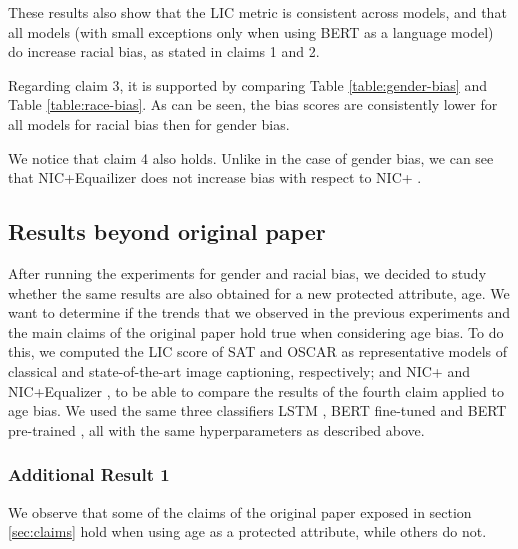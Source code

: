 These results also show that the LIC metric is consistent across models, and that all models (with small exceptions only when using BERT as a language model) do increase racial bias, as stated in claims 1 and 2.

Regarding claim 3, it is supported by comparing Table \ref{table:gender-bias} and Table \ref{table:race-bias}. As can be seen, the bias scores are consistently lower for all models for racial bias then for gender bias.

We notice that claim 4 also holds. Unlike in the case of gender bias, we can see that NIC+Equailizer \cite{Burns2018} does not increase bias with respect to NIC+ \cite{Burns2018}.


\subsection{Results beyond original paper}
\label{sec:results-beyond}

After running the experiments for gender and racial bias, we decided to study whether the same results are also obtained for a new protected attribute, age. We want to determine if the trends that we observed in the previous experiments and the main claims of the original paper hold true when considering age bias. To do this, we computed the LIC score of SAT \cite{SAT} and OSCAR \cite{OSCAR} as representative models of classical and state-of-the-art image captioning, respectively; and NIC+ \cite{Burns2018} and NIC+Equalizer \cite{Burns2018}, to be able to compare the results of the fourth claim applied to age bias. We used the same three classifiers LSTM \cite{LSTM}, BERT fine-tuned and BERT pre-trained \cite{BERT}, all with the same hyperparameters as described above. 
 
\subsubsection{Additional Result 1}

We observe that some of the claims of the original paper \cite{Hirota2022} exposed in section \ref{sec:claims} hold when using age as a protected attribute, while others do not. \par


